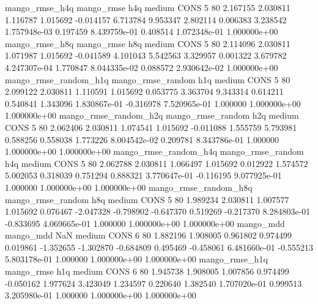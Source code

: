       mango_rmse_h4q        mango_rmse                  h4q     medium     CONS                 5 80  2.167155       2.030811 1.116787       1.015692   -0.014157      6.713784      9.953347     2.802114       0.006383  3.238542 1.757948e-03     0.197459   8.439759e-01            0.408514    1.072348e-01        1.000000e+00
       mango_rmse_h8q        mango_rmse                  h8q     medium     CONS                 5 80  2.114096       2.030811 1.071987       1.015692   -0.041589      4.101043      5.542563     3.329957       0.001322  3.679782 4.247307e-04     1.770847   8.044335e-02            0.088572    2.930642e-02        1.000000e+00
mango_rmse_random_h1q mango_rmse_random                  h1q     medium     CONS                 5 80  2.099122       2.030811 1.110591       1.015692    0.053775      3.363704      9.343314     0.614211       0.540841  1.343096 1.830867e-01    -0.316978   7.520965e-01            1.000000    1.000000e+00        1.000000e+00
mango_rmse_random_h2q mango_rmse_random                  h2q     medium     CONS                 5 80  2.062406       2.030811 1.074541       1.015692   -0.011088      1.555759      5.793981     0.588256       0.558038  1.773226 8.004542e-02     0.209781   8.343786e-01            1.000000    1.000000e+00        1.000000e+00
mango_rmse_random_h4q mango_rmse_random                  h4q     medium     CONS                 5 80  2.062788       2.030811 1.066497       1.015692    0.012922      1.574572      5.002053     0.318039       0.751294  0.888321 3.770647e-01    -0.116195   9.077925e-01            1.000000    1.000000e+00        1.000000e+00
mango_rmse_random_h8q mango_rmse_random                  h8q     medium     CONS                 5 80  1.989234       2.030811 1.007577       1.015692    0.076467     -2.047328     -0.798902    -0.647370       0.519269 -0.217370 8.284803e-01    -0.833695   4.069665e-01            1.000000    1.000000e+00        1.000000e+00
            mango_mdd         mango_mdd                  NaN     medium     CONS                 6 80  1.882196       1.908005 0.961802       0.974499    0.019861     -1.352655     -1.302870    -0.684809       0.495469 -0.458061 6.481660e-01    -0.555213   5.803178e-01            1.000000    1.000000e+00        1.000000e+00
       mango_rmse_h1q        mango_rmse                  h1q     medium     CONS                 6 80  1.945738       1.908005 1.007856       0.974499   -0.050162      1.977624      3.423049     1.234597       0.220640  1.382540 1.707020e-01     0.999513   3.205980e-01            1.000000    1.000000e+00        1.000000e+00
